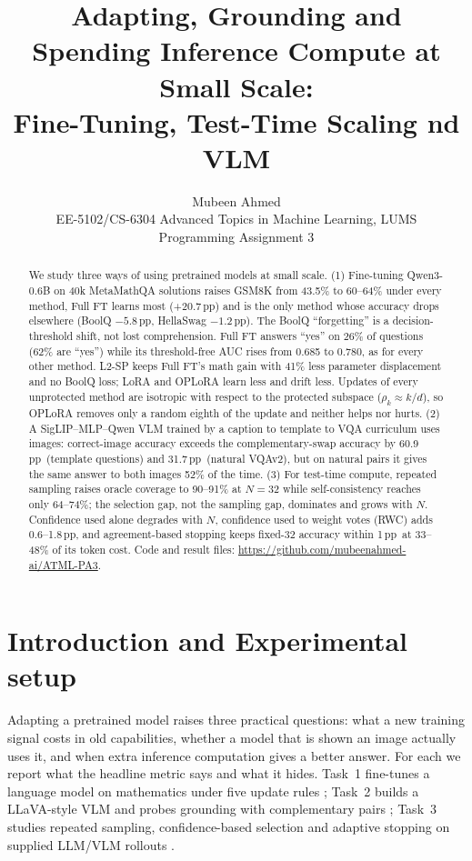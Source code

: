 \documentclass{article}
\title{Adapting, Grounding and Spending Inference Compute at Small Scale:\\
Fine-Tuning, Test-Time Scaling nd VLM  }
\author{Mubeen Ahmed\\
EE-5102/CS-6304 Advanced Topics in Machine Learning, LUMS\\
Programming Assignment 3}
\newcommand{\pp}{\,pp}
\begin{document}
\maketitle

\begin{abstract}
We study three ways of using pretrained models at small scale. (1) Fine-tuning Qwen3-0.6B on 40k MetaMathQA solutions raises GSM8K from 43.5\% to 60--64\% under every method, Full FT learns most (+20.7\pp) and is the only method whose accuracy drops elsewhere (BoolQ $-5.8$\pp, HellaSwag $-1.2$\pp). The BoolQ ``forgetting'' is a decision-threshold shift, not lost comprehension. Full FT answers ``yes'' on 26\% of questions (62\% are ``yes'') while its threshold-free AUC rises from 0.685 to 0.780, as for every other method. L2-SP keeps Full FT's math gain with 41\% less parameter displacement and no BoolQ loss; LoRA and OPLoRA learn less and drift less. Updates of every unprotected method are isotropic with respect to the protected subspace ($\rho_k\!\approx\!k/d$), so OPLoRA removes only a random eighth of the update and neither helps nor hurts. (2) A SigLIP--MLP--Qwen VLM trained by a caption to template to VQA curriculum uses images: correct-image accuracy exceeds the complementary-swap accuracy by 60.9\pp\ (template questions) and 31.7\pp\ (natural VQAv2), but on natural pairs it gives the same answer to both images 52\% of the time. (3) For test-time compute, repeated sampling raises oracle coverage to 90--91\% at $N{=}32$ while self-consistency reaches only 64--74\%; the selection gap, not the sampling gap, dominates and grows with $N$. Confidence used alone degrades with $N$, confidence used to weight votes (RWC) adds 0.6--1.8\pp, and agreement-based stopping keeps fixed-32 accuracy within 1\pp\ at 33--48\% of its token cost. Code and result files: \url{https://github.com/mubeenahmed-ai/ATML-PA3}.
\end{abstract}

\section{Introduction and Experimental setup}
Adapting a pretrained model raises three practical questions: what a new training signal costs in old capabilities, whether a model that is shown an image actually uses it, and when extra inference computation gives a better answer. For each we report what the headline metric says and what it hides. Task~1 fine-tunes a language model on mathematics under five update rules \citep{hu2022lora,li2018l2sp,xiong2026oplora}; Task~2 builds a LLaVA-style VLM \citep{liu2023llava} and probes grounding with complementary pairs \citep{goyal2017vqav2}; Task~3 studies repeated sampling, confidence-based selection and adaptive stopping on supplied LLM/VLM rollouts \citep{wang2023selfconsistency,kang2025selfcertainty,usman2026visconf}.
\end{document}
